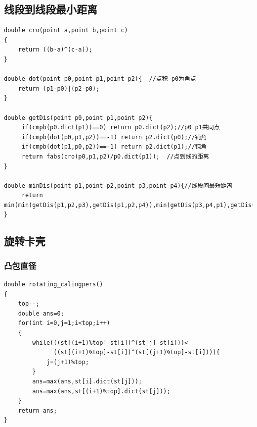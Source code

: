 \documentclass[12pt, a4paper, oneside]{ctexart}
\begin{document}
\newpage 
\subsection{线段到线段最小距离} 
\begin{lstlisting}
double cro(point a,point b,point c)
{
    return ((b-a)^(c-a));
}

double dot(point p0,point p1,point p2){  //点积 p0为角点
    return (p1-p0)|(p2-p0);
}
  
double getDis(point p0,point p1,point p2){
     if(cmpb(p0.dict(p1))==0) return p0.dict(p2);//p0 p1共同点
     if(cmpb(dot(p0,p1,p2))==-1) return p2.dict(p0);//钝角
     if(cmpb(dot(p1,p0,p2))==-1) return p2.dict(p1);//钝角
     return fabs(cro(p0,p1,p2)/p0.dict(p1));  //点到线的距离
}
  
double minDis(point p1,point p2,point p3,point p4){//线段间最短距离
     return min(min(getDis(p1,p2,p3),getDis(p1,p2,p4)),min(getDis(p3,p4,p1),getDis(p3,p4,p2)));
}
\end{lstlisting}

\newpage 
\subsection{旋转卡壳} 
\subsubsection{凸包直径}
\begin{lstlisting}
double rotating_calingpers()
{
    top--;
 	double ans=0;
    for(int i=0,j=1;i<top;i++)
    {
        while(((st[(i+1)%top]-st[i])^(st[j]-st[i]))<
              ((st[(i+1)%top]-st[i])^(st[(j+1)%top]-st[i]))){
            j=(j+1)%top;
        }
        ans=max(ans,st[i].dict(st[j]));
        ans=max(ans,st[(i+1)%top].dict(st[j]));
    }
    return ans;
}
\end{lstlisting}

\newpage 
\end{document}
